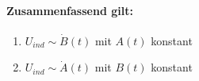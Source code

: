 \documentclass{report}
\begin{document}
		\paragraph{Zusammenfassend gilt:}
		\begin{enumerate}
			\item $U_{ind} \sim \dot B(t)$ mit $A(t)$ konstant
			\item $U_{ind} \sim \dot A(t)$ mit $B(t)$ konstant
		\end{enumerate}
\end{document}
